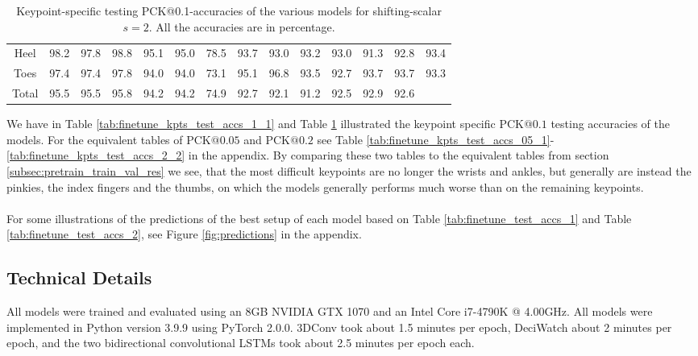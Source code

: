 \documentclass[./main.tex]{subfiles}
\begin{document}
\begin{table}[htbp]
\begin{adjustbox}{center}
\begin{tabular}{c||ccc|ccc|ccc|ccc|c}
            Heel & 98.2 & 97.8 & 98.8 & 95.1 & 95.0 & 78.5 & 93.7 & 93.0 & 93.2 & 93.0 & 91.3 & 92.8 & 93.4 \\
            Toes & 97.4 & 97.4 & 97.8 & 94.0 & 94.0 & 73.1 & 95.1 & 96.8 & 93.5 & 92.7 & 93.7 & 93.7 & 93.3 \\
            \hline
            Total & 95.5 & 95.5 & 95.8 & 94.2 & 94.2 & 74.9 & 92.7 & 92.1 & 91.2 & 92.5 & 92.9 & 92.6 & \\
            \hline
        \end{tabular}
    \end{adjustbox}
    \caption{Keypoint-specific testing PCK@0.1-accuracies of the various models for shifting-scalar $s = 2$. All the accuracies are in percentage.}
    \label{tab:finetune_kpts_test_accs_1_2}
\end{table}

\noindent We have in Table \ref{tab:finetune_kpts_test_accs_1_1} and Table \ref{tab:finetune_kpts_test_accs_1_2} illustrated the keypoint specific PCK@$0.1$ testing accuracies of the models. For the equivalent tables of PCK$@0.05$ and PCK$@0.2$ see Table \ref{tab:finetune_kpts_test_accs_05_1}-\ref{tab:finetune_kpts_test_accs_2_2} in the appendix. By comparing these two tables to the equivalent tables from section \ref{subsec:pretrain_train_val_res} we see, that the most difficult keypoints are no longer the wrists and ankles, but generally are instead the pinkies, the index fingers and the thumbs, on which the models generally performs much worse than on the remaining keypoints.
\\
\\
For some illustrations of the predictions of the best setup of each model based on Table \ref{tab:finetune_test_accs_1} and Table \ref{tab:finetune_test_accs_2}, see Figure \ref{fig:predictions} in the appendix.

\subsection{Technical Details}
\label{sec:finetune_tech_details}
All models were trained and evaluated using an 8GB NVIDIA GTX 1070 and an Intel Core i7-4790K @ 4.00GHz. All models were implemented in Python version 3.9.9 using PyTorch 2.0.0. 3DConv took about 1.5 minutes per epoch, DeciWatch about 2 minutes per epoch, and the two bidirectional convolutional LSTMs took about 2.5 minutes per epoch each.
\end{document}
